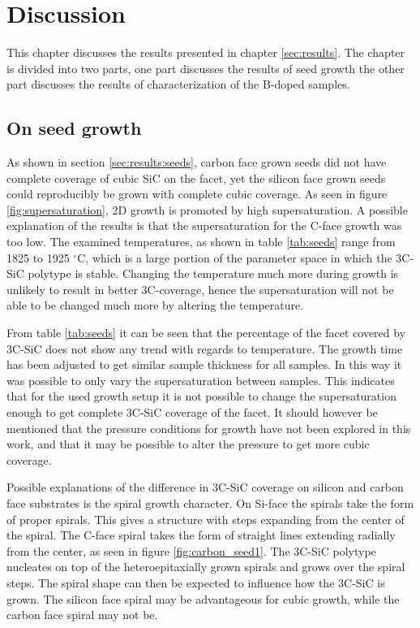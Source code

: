 
\chapter{Discussion}
\label{sec:discussion}
This chapter discusses the results presented in chapter \ref{sec:results}. The chapter is divided into two parts, one part discusses the results of seed growth the other part discusses the results of characterization of the B-doped samples. 

\section{On seed growth}
As shown in section \ref{sec:results:seeds}, carbon face grown seeds did not have complete coverage of cubic SiC on the facet, yet the silicon face grown seeds could reproducibly be grown with complete cubic coverage. As seen in figure \ref{fig:supersaturation}, 2D growth is promoted by high supersaturation. A possible explanation of the results is that the supersaturation for the C-face growth was too low. The examined temperatures, as shown in table \ref{tab:seeds}  range from 1825 to 1925 $^\circ$C, which is a large portion of the parameter space in which the 3C-SiC polytype is stable. Changing the temperature much more during growth is unlikely to result in better 3C-coverage, hence the supersaturation will not be able to be changed much more by altering the temperature. 

From table \ref{tab:seeds} it can be seen that the percentage of the facet covered by 3C-SiC does not show any trend with regards to temperature. The growth time has been adjusted to get similar sample thickness for all samples. In this way it was possible to only vary the supersaturation between samples. This indicates that for the used growth setup it is not possible to change the supersaturation enough to get complete 3C-SiC coverage of the facet. It should however be mentioned that the pressure conditions for growth have not been explored in this work, and that it may be possible to alter the pressure to get more cubic coverage. 

Possible explanations of the difference in 3C-SiC coverage on silicon and carbon face substrates is the spiral growth character. On Si-face the spirals take the form of proper spirals. This gives a structure with steps expanding from the center of the spiral. The C-face spiral takes the form of straight lines extending radially from the center, as seen in figure \ref{fig:carbon_seed1}. The 3C-SiC polytype nucleates on top of the heteroepitaxially grown spirals and grows over the spiral steps. The spiral shape can then be expected to influence how the 3C-SiC is grown. The silicon face spiral may be advantageous for cubic growth, while the carbon face spiral may not be. 

